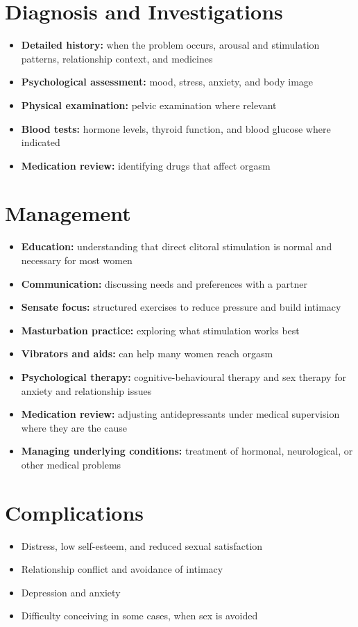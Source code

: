 \section*{Diagnosis and Investigations}
\begin{itemize}
    \item \textbf{Detailed history:} when the problem occurs, arousal and stimulation patterns, relationship context, and medicines
    \item \textbf{Psychological assessment:} mood, stress, anxiety, and body image
    \item \textbf{Physical examination:} pelvic examination where relevant
    \item \textbf{Blood tests:} hormone levels, thyroid function, and blood glucose where indicated
    \item \textbf{Medication review:} identifying drugs that affect orgasm
\end{itemize}

\section*{Management}
\begin{itemize}
    \item \textbf{Education:} understanding that direct clitoral stimulation is normal and necessary for most women
    \item \textbf{Communication:} discussing needs and preferences with a partner
    \item \textbf{Sensate focus:} structured exercises to reduce pressure and build intimacy
    \item \textbf{Masturbation practice:} exploring what stimulation works best
    \item \textbf{Vibrators and aids:} can help many women reach orgasm
    \item \textbf{Psychological therapy:} cognitive-behavioural therapy and sex therapy for anxiety and relationship issues
    \item \textbf{Medication review:} adjusting antidepressants under medical supervision where they are the cause
    \item \textbf{Managing underlying conditions:} treatment of hormonal, neurological, or other medical problems
\end{itemize}

\section*{Complications}
\begin{itemize}
    \item Distress, low self-esteem, and reduced sexual satisfaction
    \item Relationship conflict and avoidance of intimacy
    \item Depression and anxiety
    \item Difficulty conceiving in some cases, when sex is avoided
\end{itemize}


